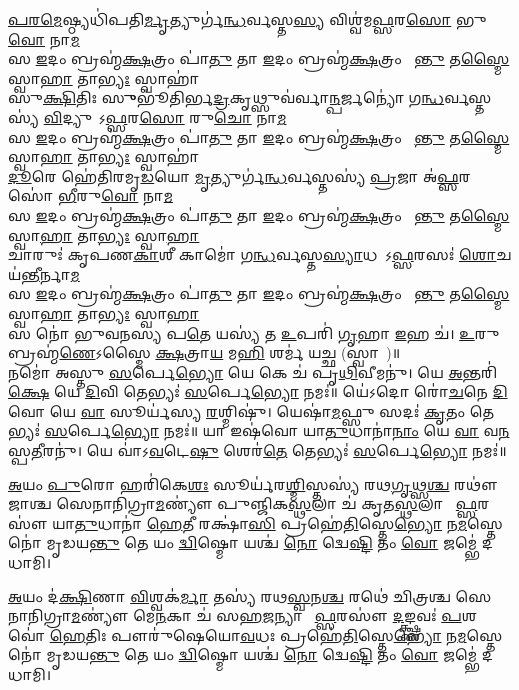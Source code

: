 \ul{𑌪}\ul{𑌰}\ul{𑌮𑍇}𑌷𑍍𑌠𑍍𑌯𑌧𑌿॑𑌪𑌤𑌿\ul{𑌰𑍍𑌮𑍃}𑌤𑍍𑌯𑍁𑌰𑍍𑌗॑\ul{𑌨𑍍𑌧}𑌰𑍍𑌵𑌸𑍍𑌤\ul{𑌸𑍍𑌯} 𑌵𑌿𑌶𑍍𑌵॑𑌮\ul{𑌫𑍍𑌸}𑌰\ul{𑌸𑍋} 𑌭𑍁\ul{𑌵𑍋}  𑌨𑌾\ul{𑌮}\\
𑌸 \ul{𑌇}𑌦𑌂 𑌬𑍍𑌰𑌹𑍍𑌮॑\ul{𑌕𑍍𑌷}𑌤𑍍𑌰𑌂 𑌪𑌾॑\ul{𑌤𑍁} 𑌤𑌾 \ul{𑌇}𑌦𑌂 𑌬𑍍𑌰𑌹𑍍𑌮॑\ul{𑌕𑍍𑌷}𑌤𑍍𑌰𑌂 𑌪𑌾᳚\ul{𑌨𑍍𑌤𑍁} 𑌤\ul{𑌸𑍍𑌮𑍈} 𑌸𑍍𑌵𑌾\ul{𑌹𑌾} 𑌤𑌾\ul{𑌭𑍍𑌯𑌃} 𑌸𑍍𑌵𑌾𑌹𑌾॑\\
𑌸𑍁\ul{𑌕𑍍𑌷𑌿}𑌤𑌿𑌃 𑌸𑍁𑍁𑌭𑍂॑𑌤𑌿𑌰𑍍𑌭\ul{𑌦𑍍𑌰}𑌕𑍃𑌥𑍍𑌸𑍁𑌵॑𑌰𑍍𑌵𑌾\ul{𑌨𑍍𑌪}𑌰𑍍𑌜𑌨𑍍𑌯𑍋॑ 𑌗\ul{𑌨𑍍𑌧}𑌰𑍍𑌵𑌸𑍍𑌤𑌸𑍍𑌯॑ \ul{𑌵𑌿}𑌦𑍍𑌯𑍁𑌤𑍋᳚𑌽\ul{𑌫𑍍𑌸}𑌰\ul{𑌸𑍋} 𑌰𑍁\ul{𑌚𑍋} 𑌨𑌾\ul{𑌮}\\
𑌸 \ul{𑌇}𑌦𑌂 𑌬𑍍𑌰𑌹𑍍𑌮॑\ul{𑌕𑍍𑌷}𑌤𑍍𑌰𑌂 𑌪𑌾॑\ul{𑌤𑍁} 𑌤𑌾 \ul{𑌇}𑌦𑌂 𑌬𑍍𑌰𑌹𑍍𑌮॑\ul{𑌕𑍍𑌷}𑌤𑍍𑌰𑌂 𑌪𑌾᳚\ul{𑌨𑍍𑌤𑍁} 𑌤\ul{𑌸𑍍𑌮𑍈} 𑌸𑍍𑌵𑌾\ul{𑌹𑌾} 𑌤𑌾\ul{𑌭𑍍𑌯𑌃} 𑌸𑍍𑌵𑌾𑌹𑌾॑\\
\ul{𑌦𑍂}𑌰𑍇 𑌹𑍇॑𑌤𑌿𑌰𑌮𑍃\ul{𑌡}𑌯𑍋 \ul{𑌮𑍃}𑌤𑍍𑌯𑍁𑌰𑍍𑌗॑\ul{𑌨𑍍𑌧}𑌰𑍍𑌵𑌸𑍍𑌤𑌸𑍍𑌯॑ \ul{𑌪𑍍𑌰}𑌜𑌾 𑌅॑\ul{𑌫𑍍𑌸}𑌰𑌸𑍋॑ \ul{𑌭𑍀}𑌰𑍁\ul{𑌵𑍋} 𑌨𑌾\ul{𑌮}\\
𑌸 \ul{𑌇}𑌦𑌂 𑌬𑍍𑌰𑌹𑍍𑌮॑\ul{𑌕𑍍𑌷}𑌤𑍍𑌰𑌂 𑌪𑌾॑\ul{𑌤𑍁} 𑌤𑌾 \ul{𑌇}𑌦𑌂 𑌬𑍍𑌰𑌹𑍍𑌮॑\ul{𑌕𑍍𑌷}𑌤𑍍𑌰𑌂 𑌪𑌾᳚\ul{𑌨𑍍𑌤𑍁} 𑌤\ul{𑌸𑍍𑌮𑍈} 𑌸𑍍𑌵𑌾\ul{𑌹𑌾} 𑌤𑌾\ul{𑌭𑍍𑌯𑌃} 𑌸𑍍𑌵𑌾\ul{𑌹𑌾}\\
𑌚𑌾𑌰𑍁𑌃॑ 𑌕𑍃𑌪𑌣\ul{𑌕𑌾}𑌶𑍀 𑌕𑌾𑌮𑍋॑ 𑌗\ul{𑌨𑍍𑌧}𑌰𑍍𑌵𑌸𑍍𑌤\ul{𑌸𑍍𑌯𑌾}𑌧𑌯𑍋᳚𑌽\ul{𑌫𑍍𑌸}𑌰𑌸𑌃॑ \ul{𑌶𑍋}𑌚𑌯॑\ul{𑌨𑍍𑌤𑍀}𑌰𑍍𑌨𑌾\ul{𑌮}\\
𑌸 \ul{𑌇}𑌦𑌂 𑌬𑍍𑌰𑌹𑍍𑌮॑\ul{𑌕𑍍𑌷}𑌤𑍍𑌰𑌂 𑌪𑌾॑\ul{𑌤𑍁} 𑌤𑌾 \ul{𑌇}𑌦𑌂 𑌬𑍍𑌰𑌹𑍍𑌮॑\ul{𑌕𑍍𑌷}𑌤𑍍𑌰𑌂 𑌪𑌾᳚\ul{𑌨𑍍𑌤𑍁} 𑌤\ul{𑌸𑍍𑌮𑍈} 𑌸𑍍𑌵𑌾\ul{𑌹𑌾} 𑌤𑌾\ul{𑌭𑍍𑌯𑌃} 𑌸𑍍𑌵𑌾\ul{𑌹𑌾}\\
𑌸 𑌨𑍋॑ 𑌭𑍁𑌵𑌨𑌸𑍍𑌯 𑌪\ul{𑌤𑍇} 𑌯𑌸𑍍𑌯॑ 𑌤 \ul{𑌉}𑌪𑌰𑌿॑ \ul{𑌗𑍃}𑌹𑌾 \ul{𑌇}𑌹 𑌚॑।
\ul{𑌉}𑌰𑍁 𑌬𑍍𑌰𑌹𑍍𑌮॑\ul{𑌣𑍇}𑌽𑌸𑍍𑌮𑍈 \ul{𑌕𑍍𑌷}𑌤𑍍𑌰𑌾\ul{𑌯} 𑌮\ul{𑌹𑌿} 𑌶𑌰𑍍𑌮॑ 𑌯𑌚𑍍𑌛 (𑌸𑍍𑌵𑌾𑌹𑌾᳚)॥\\
𑌨𑌮𑍋॑ 𑌅𑌸𑍍𑌤𑍁 \ul{𑌸}𑌰𑍍𑌪𑍇\ul{𑌭𑍍𑌯𑍋} 𑌯𑍇 𑌕𑍇 𑌚॑ 𑌪𑍃\ul{𑌥𑌿}𑌵𑍀𑌮𑌨𑍁॑।
𑌯𑍇 \ul{𑌅}𑌨𑍍𑌤𑌰𑌿॑\ul{𑌕𑍍𑌷𑍇} 𑌯𑍇 \ul{𑌦𑌿}𑌵𑌿  𑌤𑍇𑌭𑍍𑌯𑌃॑ \ul{𑌸}𑌰𑍍𑌪𑍇\ul{𑌭𑍍𑌯𑍋} 𑌨𑌮𑌃॑॥
𑌯𑍇॑𑌽𑌦𑍋 𑌰𑍋॑\ul{𑌚}𑌨𑍇 \ul{𑌦𑌿}𑌵𑍋 𑌯𑍇 \ul{𑌵𑌾} 𑌸𑍂𑌰𑍍𑌯॑𑌸𑍍𑌯 \ul{𑌰}𑌶𑍍𑌮𑌿𑌷𑍁॑।
𑌯𑍇𑌷𑌾॑\ul{𑌮}𑌫𑍍𑌸𑍁 𑌸𑌦𑌃॑ \ul{𑌕𑍃}𑌤𑌂 𑌤𑍇𑌭𑍍𑌯𑌃॑ \ul{𑌸}𑌰𑍍𑌪𑍇\ul{𑌭𑍍𑌯𑍋} 𑌨𑌮𑌃॑॥
𑌯𑌾 𑌇𑌷॑𑌵𑍋 𑌯𑌾\ul{𑌤𑍁}𑌧𑌾𑌨𑌾॑\ul{𑌨𑌾𑌂} 𑌯𑍇 \ul{𑌵𑌾} 𑌵\ul{𑌨}𑌸𑍍𑌪\ul{𑌤𑍀}\ul{}𑌰𑌨𑍁॑।
𑌯𑍇 𑌵𑌾॑𑌽\ul{𑌵}𑌟𑍇\ul{𑌷𑍁} 𑌶𑍇𑌰॑\ul{𑌤𑍇} 𑌤𑍇𑌭𑍍𑌯𑌃॑ \ul{𑌸}𑌰𑍍𑌪𑍇\ul{𑌭𑍍𑌯𑍋} 𑌨𑌮𑌃॑॥

\ul{𑌅}𑌯𑌂 \ul{𑌪𑍁}𑌰𑍋 𑌹𑌰𑌿॑𑌕𑍇\ul{𑌶𑌃} 𑌸𑍂𑌰𑍍𑌯॑𑌰\ul{𑌶𑍍𑌮𑌿}𑌸𑍍𑌤𑌸𑍍𑌯॑ 𑌰𑌥\ul{𑌗𑍃}𑌥𑍍𑌸\ul{𑌶𑍍𑌚} 𑌰𑌥𑍗॑𑌜𑌾𑌶𑍍𑌚 𑌸𑍇𑌨𑌾𑌨𑌿𑌗𑍍𑌰𑌾\ul{𑌮}𑌣𑍍𑌯𑍗॑
𑌪𑍁𑌞𑍍𑌜𑌿𑌕\ul{𑌸𑍍𑌥}𑌲𑌾 𑌚॑ 𑌕𑍃𑌤\ul{𑌸𑍍𑌥}𑌲𑌾 𑌚𑌾᳚\ul{𑌫𑍍𑌸}𑌰𑌸𑍗॑ 𑌯𑌾\ul{𑌤𑍁}𑌧𑌾𑌨𑌾॑ \ul{𑌹𑍇}𑌤𑍀 𑌰𑌕𑍍𑌷𑌾॑\ul{𑌸𑌿} 
𑌪𑍍𑌰𑌹𑍇॑\ul{𑌤𑌿}𑌸𑍍𑌤𑍇\ul{𑌭𑍍𑌯𑍋} 𑌨\ul{𑌮}𑌸𑍍𑌤𑍇 𑌨𑍋॑ 𑌮𑍃𑌡𑌯\ul{𑌨𑍍𑌤𑍁} 𑌤𑍇 𑌯𑌂 \ul{𑌦𑍍𑌵𑌿}𑌷𑍍𑌮𑍋 𑌯𑌶𑍍𑌚॑ \ul{𑌨𑍋} 𑌦𑍍𑌵𑍇\ul{𑌷𑍍𑌟𑌿} 𑌤𑌂 \ul{𑌵𑍋}  𑌜𑌮𑍍𑌭𑍇॑ 𑌦𑌧𑌾𑌮𑌿।

\ul{𑌅}𑌯𑌂 𑌦॑\ul{𑌕𑍍𑌷𑌿}𑌣𑌾 \ul{𑌵𑌿}𑌶𑍍𑌵𑌕॑\ul{𑌰𑍍𑌮𑌾} 𑌤𑌸𑍍𑌯॑ 𑌰𑌥\ul{𑌸𑍍𑌵}𑌨\ul{𑌶𑍍𑌚} 𑌰𑌥𑍇॑ 𑌚𑌿𑌤𑍍𑌰𑌶𑍍𑌚  𑌸𑍇𑌨𑌾𑌨𑌿𑌗𑍍𑌰𑌾\ul{𑌮}𑌣𑍍𑌯𑍗॑
𑌮𑍇\ul{𑌨}𑌕𑌾 𑌚॑ 𑌸𑌹\ul{𑌜}𑌨𑍍𑌯𑌾 𑌚𑌾᳚\ul{𑌫𑍍𑌸}𑌰𑌸𑍗॑ \ul{𑌦}𑌙𑍍𑌕𑍍𑌷𑍍𑌣𑌵𑌃॑ \ul{𑌪}𑌶𑌵𑍋॑ \ul{𑌹𑍇}𑌤𑌿𑌃 𑌪𑍗𑌰𑍁॑𑌷𑍇𑌯𑍋\ul{𑌵}𑌧𑌃
𑌪𑍍𑌰𑌹𑍇॑\ul{𑌤𑌿}𑌸𑍍𑌤𑍇\ul{𑌭𑍍𑌯𑍋} 𑌨\ul{𑌮}𑌸𑍍𑌤𑍇 𑌨𑍋॑ 𑌮𑍃𑌡𑌯\ul{𑌨𑍍𑌤𑍁} 𑌤𑍇 𑌯𑌂 \ul{𑌦𑍍𑌵𑌿}𑌷𑍍𑌮𑍋 𑌯𑌶𑍍𑌚॑ \ul{𑌨𑍋} 𑌦𑍍𑌵𑍇\ul{𑌷𑍍𑌟𑌿} 𑌤𑌂 \ul{𑌵𑍋}  𑌜𑌮𑍍𑌭𑍇॑ 𑌦𑌧𑌾𑌮𑌿।

